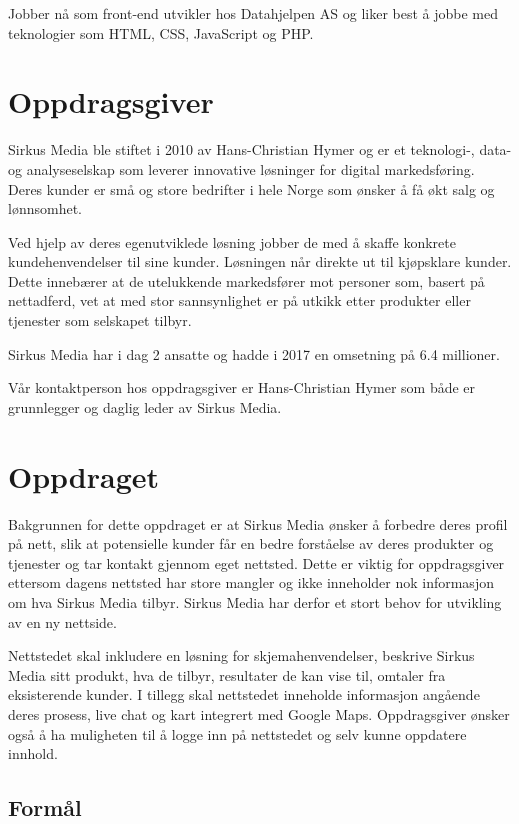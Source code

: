 \documentclass[11pt,a4paper]{report}
\begin{document}
Jobber nå som front-end utvikler hos Datahjelpen AS og liker best å jobbe med teknologier som HTML, CSS, JavaScript og PHP.

\section*{Oppdragsgiver}

Sirkus Media ble stiftet i 2010 av Hans-Christian Hymer og er et teknologi-, data- og analyseselskap som leverer innovative løsninger for digital markedsføring. Deres kunder er små og store bedrifter i hele Norge som ønsker å få økt salg og lønnsomhet. 

Ved hjelp av deres egenutviklede løsning jobber de med å skaffe konkrete kundehenvendelser til sine kunder. Løsningen når direkte ut til kjøpsklare kunder. Dette innebærer at de utelukkende markedsfører mot personer som, basert på nettadferd, vet at med stor sannsynlighet er på utkikk etter produkter eller tjenester som selskapet tilbyr.

Sirkus Media har i dag 2 ansatte og hadde i 2017 en omsetning på 6.4 millioner.

Vår kontaktperson hos oppdragsgiver er Hans-Christian Hymer som både er grunnlegger og daglig leder av Sirkus Media. 

\section*{Oppdraget}

Bakgrunnen for dette oppdraget er at Sirkus Media ønsker å forbedre deres profil på nett, slik at potensielle kunder får en bedre forståelse av deres produkter og tjenester og tar kontakt gjennom eget nettsted. Dette er viktig for oppdragsgiver ettersom dagens nettsted har store mangler og ikke inneholder nok informasjon om hva Sirkus Media tilbyr. Sirkus Media har derfor et stort behov for utvikling av en ny nettside. 

Nettstedet skal inkludere en løsning for skjemahenvendelser, beskrive Sirkus Media sitt produkt, hva de tilbyr, resultater de kan vise til, omtaler fra eksisterende kunder.
I tillegg skal nettstedet inneholde informasjon angående deres prosess, live chat og kart integrert med Google Maps. Oppdragsgiver ønsker også å ha muligheten til å logge inn på nettstedet og selv kunne oppdatere innhold.

\subsection*{Formål}
\end{document}
